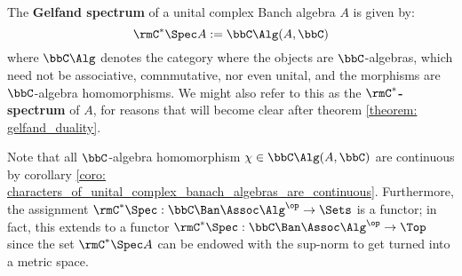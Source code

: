         \begin{definition} \label{def: gelfand_spectra}
            The \textbf{Gelfand spectrum} of a unital complex Banch algebra $A$ is given by:
                $$\rmC^*\-\Spec A := \bbC\-\Alg(A, \bbC)$$
            where $\bbC\-\Alg$ denotes the category where the objects are $\bbC$-algebras, which need not be associative, comnmutative, nor even unital, and the morphisms are $\bbC$-algebra homomorphisms. We might also refer to this as the \textbf{$\rmC^*$-spectrum} of $A$, for reasons that will become clear after theorem \ref{theorem: gelfand_duality}.
        \end{definition}
        \begin{remark}
            Note that all $\bbC$-algebra homomorphism $\chi \in \bbC\-\Alg(A, \bbC)$ are continuous by corollary \ref{coro: characters_of_unital_complex_banach_algebras_are_continuous}. Furthermore, the assignment $\rmC^*\-\Spec: \bbC\Ban\Assoc\Alg^{\op} \to \Sets$ is a functor; in fact, this extends to a functor $\rmC^*\-\Spec: \bbC\Ban\Assoc\Alg^{\op} \to \Top$ since the set $\rmC^*\-\Spec A$ can be endowed with the sup-norm to get turned into a metric space. 
        \end{remark}

